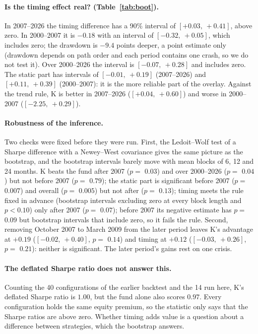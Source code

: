 \documentclass[11pt,a4paper]{article}
\begin{document}
\paragraph{Is the timing effect real? (Table~\ref{tab:boot}).} In 2007--2026 the timing difference has a 90\%
interval of $[+0.03,\ +0.41]$, above zero. In 2000--2007 it is $-0.18$ with an interval of $[-0.32,\ +0.05]$, which includes zero; the drawdown is
$-9.4$ points deeper, a point estimate only (drawdown depends on path order and each period contains one
crash, so we do not test it). Over 2000--2026
the interval is $[-0.07,\ +0.28]$ and includes zero. The static part has intervals of $[-0.01,\ +0.19]$ (2007--2026) and
$[+0.11,\ +0.39]$ (2000--2007): it is the more reliable part of the overlay. Against the trend rule, K is better in
2007--2026 ($[+0.04,\ +0.60]$) and worse in 2000--2007 ($[-2.25,\ +0.29]$).

\paragraph{Robustness of the inference.} Two checks were fixed before they were run. First, the Ledoit--Wolf
test of a Sharpe difference with a Newey--West covariance gives the same picture as the bootstrap, and the
bootstrap intervals barely move with mean blocks of 6, 12 and 24 months. K beats the fund after 2007 ($p=$
$0.03$) and over 2000--2026 ($p=$ $0.04$) but not before 2007 ($p=$ $0.79$); the static part is
significant before 2007 ($p=$ $0.007$) and overall ($p=$ $0.005$) but not after ($p=$ $0.13$);
timing meets the rule fixed in advance (bootstrap intervals excluding zero at every block length and $p<0.10$)
only after 2007 ($p=$ $0.07$); before 2007 its negative estimate has $p=$ $0.09$ but bootstrap intervals
that include zero, so it fails the rule. Second, removing October 2007 to March 2009 from the later period leaves K's advantage at
$+0.19$ ($[-0.02,\ +0.40]$, $p=$ $0.14$) and timing at $+0.12$ ($[-0.03,\ +0.26]$, $p=$ $0.21$): neither is
significant. The later period's gains rest on one crisis.

\paragraph{The deflated Sharpe ratio does not answer this.} Counting the 40 configurations of the
earlier backtest and the 14 run here, K's deflated Sharpe ratio \citep{bailey2014} is $1.00$, but the
fund alone also scores $0.97$. Every configuration holds the same equity premium, so the statistic only says
that the Sharpe ratios are above zero. Whether timing adds value is a question about a difference between
strategies, which the bootstrap answers.
\end{document}
